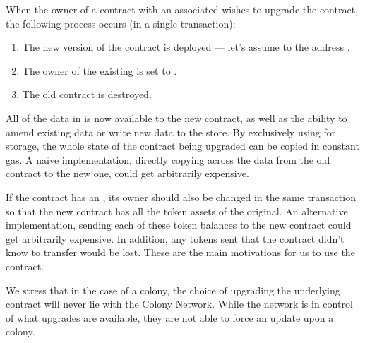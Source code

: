 When the owner of a contract with an associated  wishes to upgrade the contract, the following process occurs (in a single transaction):

\begin{enumerate}
\item The new version of the contract is deployed --- let's assume to the address .
\item The owner of the existing  is set to .
\item The old contract is destroyed.
\end{enumerate}

All of the data in  is now available to the new contract, as well as the ability to amend existing data or write new data to the store. By exclusively using  for storage, the whole state of the contract being upgraded can be copied in constant gas. A na{\"i}ve implementation, directly copying across the data from the old contract to the new one, could get arbitrarily expensive.

If the contract has an , its owner should also be changed in the same transaction so that the new contract has all the token assets of the original. An alternative implementation, sending each of these token balances to the new contract could get arbitrarily expensive. In addition, any tokens sent that the contract didn't know to transfer would be lost. These are the main motivations for us to use the  contract.

We stress that in the case of a colony, the choice of upgrading the underlying  contract will never lie with the Colony Network. While the network is in control of what upgrades are available, they are not able to force an update upon a colony.
